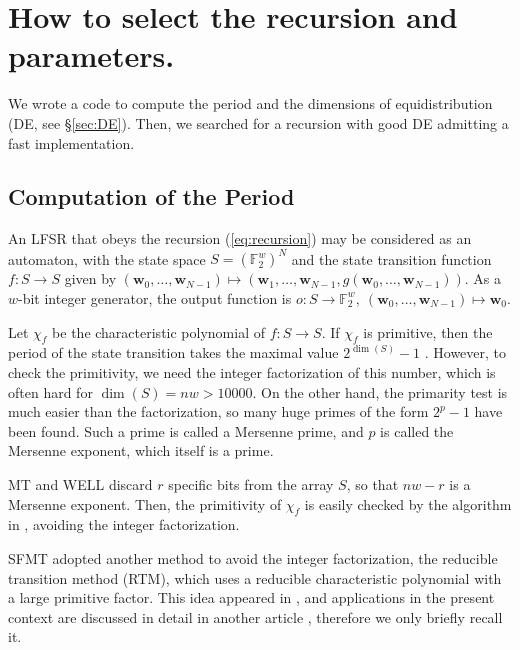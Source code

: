 \documentclass{svmult}
\def\F2{{\mathbb F}_2}
\def\bw{{{\mathbf w}}}
\begin{document}
\section{How to select the recursion and parameters.}
We wrote a code to compute the period and
the dimensions of equidistribution (DE,
see \S\ref{sec:DE}). 
Then, we searched
for a recursion with good DE admitting a fast implementation.  

\subsection{Computation of the Period}\label{sec:period}
An LFSR that obeys the recursion (\ref{eq:recursion})
may be considered as an automaton, 
with the state space $S=(\F2^{w})^{N}$
and the state transition function 
$f: S \to S$ given by
$(\bw_0,\ldots,\bw_{N-1})
\mapsto (\bw_1,\ldots,\bw_{N-1}, g(\bw_0,\ldots,\bw_{N-1}))$.  
As a $w$-bit integer generator, the output function is 
$o: S \to \F2^{w},\  (\bw_0,\ldots,\bw_{N-1}) \mapsto \bw_0$.

Let $\chi_f$ be the characteristic polynomial of $f:S \to S$.
If $\chi_f$ is primitive, then the 
period of the state transition takes the maximal value
$2^{\dim(S)}-1$ \cite[\S3.2.2]{knuth:bible}. 
However, to check the primitivity, we need
the integer factorization of this number, which is often
hard for $\dim(S)=nw>10000$. 
On the other hand, the primarity test is much easier than 
the factorization, so many huge primes of the form 
$2^p-1$ have been found. 
Such a prime is called a Mersenne prime, and $p$ is
called the Mersenne exponent, which itself is a prime.

MT and WELL\cite{WELL} discard $r$ specific bits from the
array $S$, so that $nw-r$ is a Mersenne exponent. 
Then, the primitivity of $\chi_f$ is easily checked
by the algorithm in \cite[\S3.2.2]{knuth:bible},
avoiding the integer factorization.

SFMT adopted
another method to avoid the integer factorization,
the reducible transition method (RTM), 
which uses a reducible characteristic polynomial
with a large primitive factor.
This idea appeared in \cite{FUSHIMI90}
\cite{BRENT}\cite{BRENT-PRIM}, and 
applications in the present context are 
discussed in detail in another article \cite{PMT}, 
therefore we only briefly recall it. 
\end{document}
